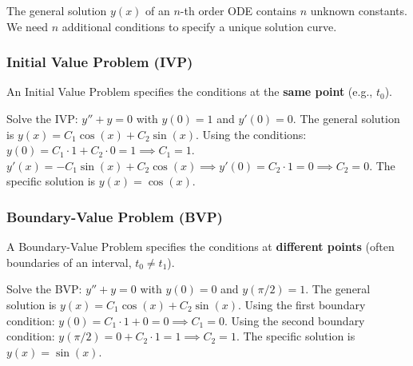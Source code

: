 The general solution $y(x)$ of an $n$-th order ODE contains $n$ unknown constants. We need $n$ additional conditions to specify a unique solution curve.

\subsubsection{Initial Value Problem (IVP)}
An Initial Value Problem specifies the conditions at the \textbf{same point} (e.g., $t_0$). 
\begin{example}
    Solve the IVP: $y'' + y = 0$ with $y(0) = 1$ and $y'(0) = 0$.
    The general solution is $y(x) = C_1 \cos(x) + C_2 \sin(x)$.
    Using the conditions:
    $y(0) = C_1 \cdot 1 + C_2 \cdot 0 = 1 \implies C_1 = 1$.
    $y'(x) = -C_1 \sin(x) + C_2 \cos(x) \implies y'(0) = C_2 \cdot 1 = 0 \implies C_2 = 0$.
    The specific solution is $y(x) = \cos(x)$.
\end{example}

\subsubsection{Boundary-Value Problem (BVP)}
A Boundary-Value Problem specifies the conditions at \textbf{different points} (often boundaries of an interval, $t_0 \ne t_1$).
\begin{example}
    Solve the BVP: $y'' + y = 0$ with $y(0) = 0$ and $y(\pi/2) = 1$.
    The general solution is $y(x) = C_1 \cos(x) + C_2 \sin(x)$.
    Using the first boundary condition: $y(0) = C_1 \cdot 1 + 0 = 0 \implies C_1 = 0$.
    Using the second boundary condition: $y(\pi/2) = 0 + C_2 \cdot 1 = 1 \implies C_2 = 1$.
    The specific solution is $y(x) = \sin(x)$.
\end{example}